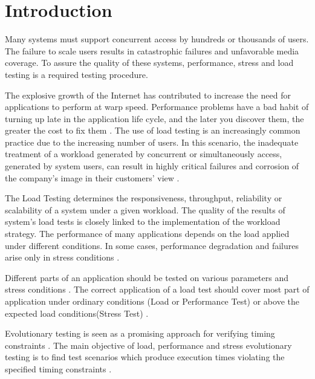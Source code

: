 \section{Introduction}

Many systems must support concurrent
access by hundreds or thousands of users. The failure to scale users results in catastrophic failures and unfavorable media coverage\cite{Jiang2010}. To assure the quality of these systems, performance, stress and load testing is a required testing procedure\cite{Jiang2009}. 

The explosive growth of the Internet has contributed to  increase the need for applications to perform at warp speed. Performance problems have a bad habit of turning up late in the application life cycle, and the later you discover them, the greater the cost to fix them \cite{Molyneaux2009}.
%
%
%
% 
%
The use of load testing is an increasingly common practice due to the increasing number of users. In this scenario, the inadequate treatment of a workload generated by concurrent or simultaneously access, generated by system users, can result in highly critical failures and corrosion of the company's image in their customers' view \cite{Draheim2006b} \cite{Jiang2010}. 
%
%

The Load Testing determines the responsiveness, throughput, reliability or scalability of a system under a given workload. The quality of the results of system's load tests is closely linked to the implementation of the workload strategy. The performance of many applications depends on the load applied under different conditions. In some cases, performance degradation and failures arise only in stress conditions \cite{Garousi2010} \cite{Jiang2010}.


Different parts of an application should be tested on various parameters and stress conditions \cite{Babbar2011}. The correct application of a load test should cover most part of application under ordinary conditions (Load or Performance Test) or above the expected load conditions(Stress Test) \cite{Draheim2006b} \cite{Luiz2011} \cite{Fe2004}.

Evolutionary testing is seen as a promising approach for verifying timing constraints \cite{Afzal2009a}. The main objective of load, performance and stress evolutionary testing is to find test scenarios which produce execution times violating the specified timing constraints \cite{Sullivan}. 

